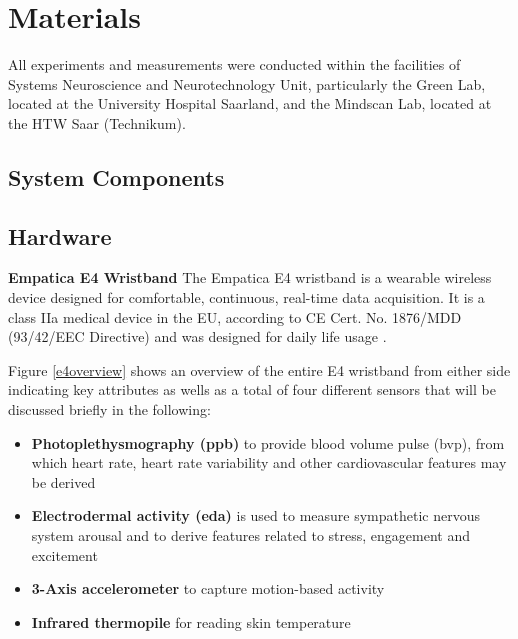 \section{Materials}
All experiments and measurements were conducted within the facilities of Systems Neuroscience and Neurotechnology Unit, particularly the Green Lab, located at the University Hospital Saarland, and the Mindscan Lab, located at the HTW Saar (Technikum).

\subsection{System Components}
\subsection{Hardware}
\textbf{Empatica E4 Wristband}
The Empatica E4 wristband is a wearable wireless device designed for comfortable, continuous, real-time data acquisition. It is a class IIa medical device in the EU, according to CE Cert. No. 1876/MDD (93/42/EEC Directive) and was designed for daily life usage \cite{e4}.


Figure \ref{e4overview} shows an overview of the entire E4 wristband from either side indicating key attributes as wells as a total of four different sensors that will be discussed briefly in the following:

\begin{itemize}
\item \textbf{Photoplethysmography (\gls{ppb})} to provide blood volume pulse (\gls{bvp}), from which heart rate, heart rate variability and other cardiovascular features may be derived
\item \textbf{Electrodermal activity (\gls{eda})} is used to measure sympathetic nervous system arousal and to derive features related to stress, engagement and excitement
\item \textbf{3-Axis accelerometer} to capture motion-based activity
\item \textbf{Infrared thermopile} for reading skin temperature
\end{itemize}

